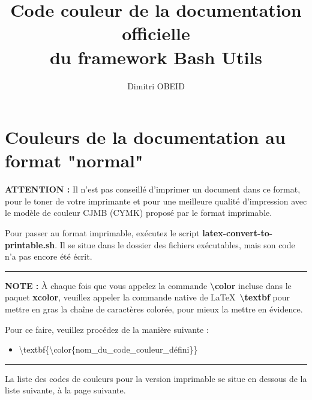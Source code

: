 \documentclass[a4paper,10pt]{article}
\title{\color{sec1}Code couleur de la documentation officielle \\du framework Bash Utils}\color{text}
\author{Dimitri OBEID}
\begin{document}
\maketitle
\newpage

\color{sec1}
\section{Couleurs de la documentation au format "normal"}\color{text}

\begin{justify}
  \textbf{\color{case}ATTENTION :} Il n'est pas conseillé d'imprimer un document dans ce format, pour le toner de votre imprimante et pour une meilleure qualité d'impression avec le modèle de couleur CJMB (CYMK) proposé par le format imprimable.

  Pour passer au format imprimable, exécutez le script \textbf{\color{cmds}latex-convert-to-printable.sh}. Il se situe dans le dossier des fichiers exécutables, mais son code n'a pas encore été écrit.
\end{justify}

\color{text}\par\noindent\rule{\textwidth}{0.4pt}\color{text}

\begin{justify}
  \textbf{NOTE :} À chaque fois que vous appelez la commande \textbf{\textbackslash{color}} incluse dans le paquet \textbf{xcolor}, veuillez appeler la commande native de \LaTeX \ \textbf{\textbackslash{textbf}} pour mettre en gras la chaîne de caractères colorée, pour mieux la mettre en évidence.
\end{justify}

\begin{justify}
  Pour ce faire, veuillez procédez de la manière suivante :

  \begin{itemize}
    \item \textbackslash{textbf\{\textbackslash{color\{nom\_du\_code\_couleur\_défini}\}}\}
  \end{itemize}
\end{justify}

\color{text}\par\noindent\rule{\textwidth}{0.4pt}\color{text}

\begin{justify}
  La liste des codes de couleurs pour la version imprimable se situe en dessous de la liste suivante, à la page suivante.
\end{justify}
\end{document}
